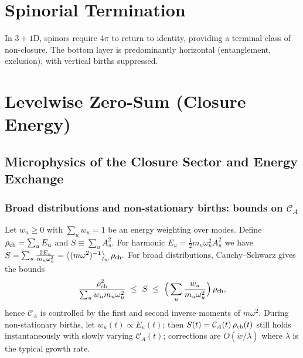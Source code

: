 \documentclass[11pt]{article}
\begin{document}
\section{Spinorial Termination}
In $3{+}1$D, spinors require $4\pi$ to return to identity, providing a terminal class of non-closure. 
The bottom layer is predominantly horizontal (entanglement, exclusion), with vertical births suppressed.



\section{Levelwise Zero-Sum (Closure Energy)}

\subsection{Microphysics of the Closure Sector and Energy Exchange}\label{subsec:closure-micro}
\subsubsection{Broad distributions and non-stationary births: bounds on $\mathcal C_A$}\label{subsub:CA-bounds}
Let $w_u\!\ge\!0$ with $\sum_u w_u=1$ be an energy weighting over modes. Define $\rho_{\rm ch}=\sum_u E_u$ and $S\equiv \sum_u A_u^2$.
For harmonic $E_u=\tfrac12 m_u\omega_u^2 A_u^2$ we have
\(
S=\sum_u \frac{2E_u}{m_u\omega_u^2}=\big\langle (m\omega^2)^{-1}\big\rangle_{\!w}\,\rho_{\rm ch}.
\)
For broad distributions, Cauchy--Schwarz gives the bounds
\begin{equation}
\frac{\rho_{\rm ch}^2}{\sum_u w_u m_u\omega_u^2}\ \le\ S\ \le\ \Big(\sum_u \frac{w_u}{m_u\omega_u^2}\Big)\,\rho_{\rm ch},
\end{equation}
hence $\mathcal C_A$ is controlled by the first and second inverse moments of $m\omega^2$. During non-stationary births, let $w_u(t)\propto E_u(t)$;
then $S(t)=\mathcal C_A(t)\,\rho_{\rm ch}(t)$ still holds instantaneously with slowly varying $\mathcal C_A(t)$; corrections are $O(\dot w/\bar\lambda)$ where $\bar\lambda$ is the typical growth rate.
\end{document}
